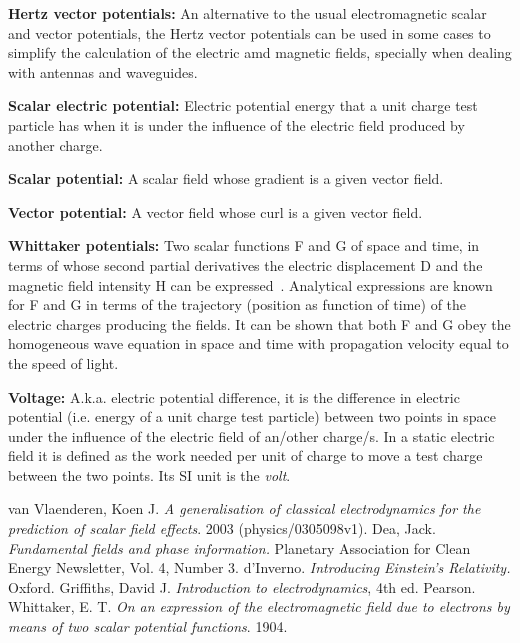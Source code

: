 \documentclass[english]{book}
\begin{document}
\begin{list}{}{}
\begin{list}{}{}
		\item \textbf{Hertz vector potentials:} An alternative to the usual electromagnetic scalar and vector potentials, the Hertz vector potentials can be used in some cases to simplify the calculation of the electric amd magnetic fields, specially when dealing with antennas and waveguides.
		
		\item \textbf{Scalar electric potential:} Electric potential energy that a unit charge test particle has when it is under the influence of the electric field produced by another charge.
		
		\item \textbf{Scalar potential:} A scalar field whose gradient is a given vector field.
		
		\item \textbf{Vector potential:} A vector field whose curl is a given vector field.
		
		\item \textbf{Whittaker potentials:} Two scalar functions F and G of space and time, in terms of whose second partial derivatives the electric displacement D and the magnetic field intensity H can be expressed~\cite{Whittaker}. Analytical expressions are known for F and G in terms of the trajectory (position as function of time) of the electric charges producing the fields. It can be shown that both F and G obey the homogeneous wave equation in space and time with propagation velocity equal to the speed of light.
	\end{list}
	
	
	\item \textbf{Voltage:} A.k.a. electric potential difference, it is the difference in electric potential (i.e. energy of a unit charge test particle) between two points in space under the influence of the electric field of an/other charge/s. In a static electric field it is defined as the work needed per unit of charge to move a test charge between the two points. Its SI unit is the \emph{volt}.
\end{list}


\begin{thebibliography}{99}
	 van Vlaenderen, Koen J. \emph{A generalisation of classical electrodynamics for the prediction of scalar field effects}. 2003 (physics/0305098v1).
	 Dea, Jack. \emph{Fundamental fields and phase information.} Planetary Association for Clean Energy Newsletter, Vol. 4, Number 3.
	 d'Inverno. \emph{Introducing Einstein's Relativity.} Oxford.
	 Griffiths, David J. \emph{Introduction to electrodynamics}, 4th ed. Pearson.
	 Whittaker, E. T. \emph{On an expression of the electromagnetic field due to electrons by means of two scalar potential functions}. 1904.
\end{thebibliography}
\end{document}
